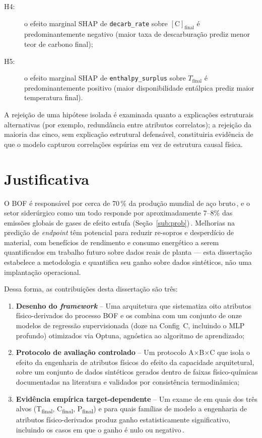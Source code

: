 \begin{enumerate}
\begin{description}
    \item[H4:] o efeito marginal SHAP de \texttt{decarb\_rate} sobre $[\text{C}]_\text{final}$ é predominantemente negativo (maior taxa de descarburação prediz menor teor de carbono final);
    \item[H5:] o efeito marginal SHAP de \texttt{enthalpy\_surplus} sobre $T_\text{final}$ é predominantemente positivo (maior disponibilidade entálpica prediz maior temperatura final).
  \end{description}
  A rejeição de uma hipótese isolada é examinada quanto a explicações estruturais alternativas (por exemplo, redundância entre atributos correlatos); a rejeição da maioria das cinco, sem explicação estrutural defensável, constituiria evidência de que o modelo capturou correlações espúrias em vez de estrutura causal física.
\end{enumerate}

\section{Justificativa}
\label{sec:just}

O BOF é responsável por cerca de 70\,\% da produção mundial de aço bruto\,\cite{worldsteel2025figures}, e o setor siderúrgico como um todo responde por aproximadamente 7–8\% das emissões globais de gases de efeito estufa (Seção~\ref{sub:prob})\,\cite{worldsteel2025climate}. Melhorias na predição de \textit{endpoint} têm potencial para reduzir re-sopros e desperdício de material, com benefícios de rendimento e consumo energético a serem quantificados em trabalho futuro sobre dados reais de planta — esta dissertação estabelece a metodologia e quantifica seu ganho sobre dados sintéticos, não uma implantação operacional.

Dessa forma, as contribuições desta dissertação são três:

\begin{enumerate}
  \item \textbf{Desenho do \textit{framework}} – Uma arquitetura que sistematiza oito atributos físico-derivados do processo BOF e os combina com um conjunto de onze modelos de regressão supervisionada (doze na Config~C, incluindo o MLP profundo) otimizados via Optuna, agnóstica ao algoritmo de aprendizado;
  \item \textbf{Protocolo de avaliação controlado} – Um protocolo A$\times$B$\times$C que isola o efeito da engenharia de atributos físicos do efeito da capacidade arquitetural, sobre um conjunto de dados sintéticos gerados dentro de faixas físico-químicas documentadas na literatura e validados por consistência termodinâmica;
  \item \textbf{Evidência empírica target-dependente} – Um exame de em quais dos três alvos (T\textsubscript{final}, C\textsubscript{final}, P\textsubscript{final}) e para quais famílias de modelo a engenharia de atributos físico-derivados produz ganho estatisticamente significativo, incluindo os casos em que o ganho é nulo ou negativo\,\cite{willard2020integrating}.
\end{enumerate}

